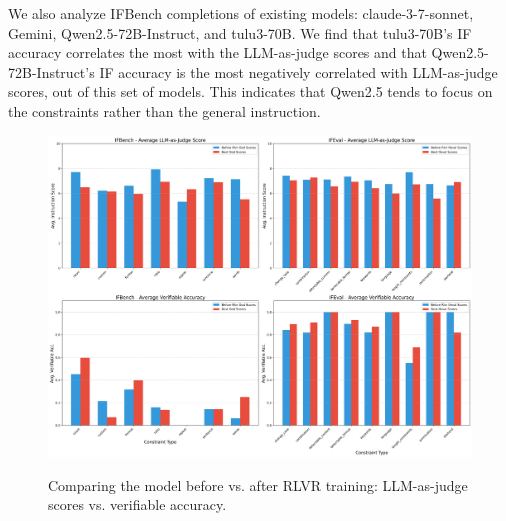 \documentclass{article}
\begin{document}
We also analyze IFBench completions of existing models: claude-3-7-sonnet, Gemini, Qwen2.5-72B-Instruct, and tulu3-70B. We find that tulu3-70B's IF accuracy correlates the most with the LLM-as-judge scores and that Qwen2.5-72B-Instruct's IF accuracy is the most negatively correlated with LLM-as-judge scores, out of this set of models. This indicates that Qwen2.5 tends to focus on the constraints rather than the general instruction.



\begin{figure}[t]
    \centering
    \includegraphics[width=\linewidth]{figures/combined_model_scores_comparison.png}
    \label{fig:inst-vs-const}
        \caption{Comparing the model before vs. after RLVR training: LLM-as-judge scores vs. verifiable accuracy.}

\end{figure}
\end{document}
